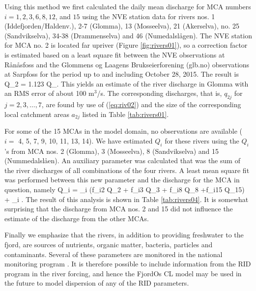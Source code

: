 Using this method we first calculated the daily mean discharge for MCA numbers $i=1, 2, 3, 6, 8, 12$, and $15$ using the NVE station data for rivers nos. 1 (Iddefjorden/Haldenv.), 2-7 (Glomma), 13 (Mosseelva), 21 (Akerselva), no. 25 (Sandvikselva), 34-38 (Drammenselva) and 46 (Numedalsl{\aa}gen). The NVE station for MCA no. 2 is located far upriver (Figure \ref{fig:rivers01}), so a correction factor is estimated based on a least square fit between the NVE observations at R{\aa}n{\aa}sfoss and the Glommens og Laagens Brukseierforening (glb.no) observations at Sarpfoss for the period up to and including October 28, 2015. The result is
\be
 \label{eq:riv04}
 Q_2 = 1.123 \cdot Q_{}.
\ee
This yields an estimate of the river discharge in Glomma with an RMS error of about 100 m$^3$/s. The corresponding discharges, that is, $q_{2j}$ for $j=2,3,\ldots,7$, are found by use of (\ref{eq:riv02}) and the size of the corresponding local catchment areas $a_{2j}$ listed in Table \ref{tab:rivers01}.


For some of the 15 MCAs in the model domain, no observations are available ($i=$ 4, 5, 7, 9, 10, 11, 13, 14). We have estimated $Q_i$ for these rivers using the $Q_i$'s from MCA nos. 2 (Glomma), 3 (Mosseelva), 8 (Sandvikselva) and 15 (Nummedalsl{\aa}en). An auxiliary parameter was calculated that was the sum of the river discharges of all combinations of the four rivers. A least mean square fit was performed between this new parameter and the discharge for the MCA in question, namely 
\be
 \label{eq:riv05}
 Q_i = \alpha_i \left(f_{i2} Q_2 + f_{i3} Q_3 + f_{i8} Q_8 +f_{i15} Q_{15}\right) + \beta_i .
\ee
The result of this analysis is shown in Table \ref{tab:rivers04}. It is somewhat surprising that the discharge from MCA nos. 2 and 15 did not influence the estimate of the discharge from the other MCAs.   


Finally we emphasize that the rivers, in addition to providing freshwater to the fjord, are sources of nutrients, organic matter, bacteria, particles and contaminants. Several of these parameters are monitored in the national monitoring program \citep[Riverine Inputs and direct Discharges - RID,][]{skarb:etal:2011}. It is therefore possible to include information from the RID program in the river forcing, and hence the FjordOs CL model may be used in the future to model dispersion of any of the RID parameters.





